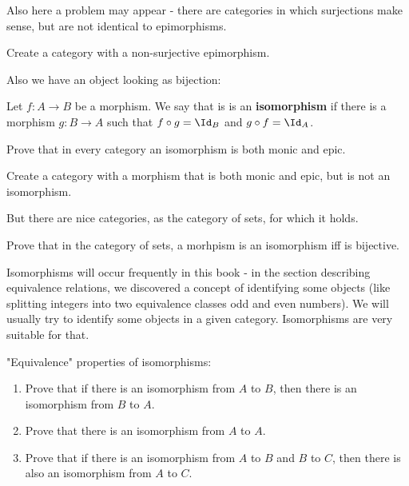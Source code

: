 Also here a problem may appear - there are categories in which surjections make sense, but are not identical to epimorphisms.

\begin{exercise}
  Create a category with a non-surjective epimorphism.
\end{exercise}

Also we have an object looking as bijection:

\begin{definition}
  Let $f: A\to B$ be a morphism. We say that is is an \textbf{isomorphism} if there is a morphism $g:B\to A$ such that $f\circ g=\Id_B$ and $g\circ f=\Id_A$.
\end{definition}

\begin{exercise}
  Prove that in every category an isomorphism is both monic and epic.
\end{exercise}

\begin{exercise}
  Create a category with a morphism that is both monic and epic, but is not an isomorphism.
\end{exercise}

But there are nice categories, as the category of sets, for which it holds.

\begin{exercise}
  Prove that in the category of sets, a morhpism is an isomorphism iff is bijective.
\end{exercise}

Isomorphisms will occur frequently in this book - in the section describing equivalence relations, we discovered a concept of identifying some objects (like splitting integers into two equivalence
classes odd and even numbers). We will usually try to identify some objects in a given category. Isomorphisms are very suitable for that.

\begin{exercise}
  "Equivalence" properties of isomorphisms:
  \begin{enumerate}
    \item Prove that if there is an isomorphism from $A$ to $B$, then there is an isomorphism from $B$ to $A$.
    \item Prove that there is an isomorphism from $A$ to $A$.
    \item Prove that if there is an isomorphism from $A$ to $B$ and $B$ to $C$, then there is also an isomorphism from $A$ to $C$.
  \end{enumerate}
\end{exercise}

